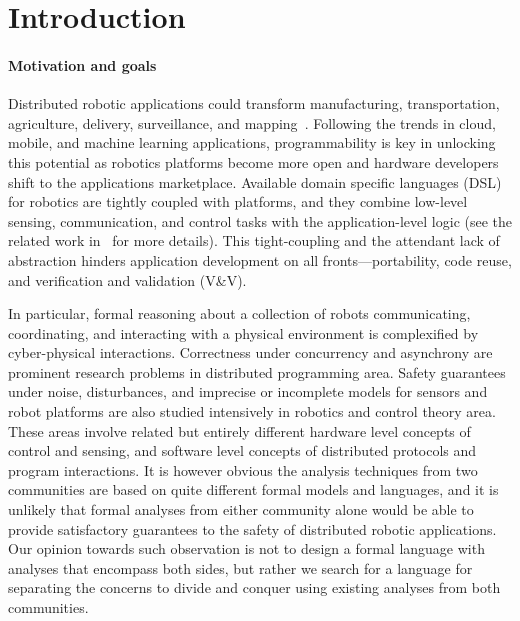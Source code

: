 \section{Introduction}
\label{sec:intro}

\paragraph{Motivation and goals}
Distributed robotic applications could transform manufacturing, transportation, agriculture, delivery, surveillance, and mapping~\cite{find}.
Following the trends in cloud, mobile, and machine learning applications, programmability is key in unlocking this potential
as robotics platforms become more open and hardware developers shift to the applications marketplace.
Available domain specific languages (DSL) for robotics are tightly coupled with platforms,
and they combine low-level sensing, communication, and control tasks with the application-level logic
(see the related work in~ for more details).
This tight-coupling and the attendant lack of abstraction hinders application development on all fronts---portability, code reuse, and verification and validation (V\&V).

In particular, formal reasoning about a collection of robots communicating, coordinating, and interacting with a physical environment
is complexified by cyber-physical interactions.
Correctness under concurrency and asynchrony are prominent research problems in distributed programming area.
Safety guarantees under noise, disturbances, and imprecise or incomplete models for sensors and robot platforms are also studied intensively in robotics and control theory area.
These areas involve related but entirely different hardware level concepts of control and sensing,
and software level concepts of distributed protocols and program interactions.
It is however obvious the analysis techniques from two communities are based on quite different formal models and languages,
and it is unlikely that formal analyses from either community alone would be able to provide satisfactory guarantees
to the safety of distributed robotic applications.
Our opinion towards such observation is not to design a formal language with analyses that encompass both sides,
but rather we search for a language for separating the concerns to divide and conquer using existing analyses from both communities.

